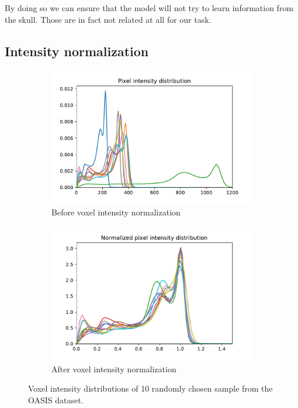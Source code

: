 By doing so we can ensure that the model will not try to learn information from the skull. Those are in fact not related at all for our task.

\subsection{Intensity normalization}

\begin{figure}
\centering
\begin{subfigure}{.5\textwidth}
  \centering
  \includegraphics[width=1\linewidth]{figures/preprocessing/intensity_before_norm.pdf}
  \caption{Before voxel intensity normalization}
  \label{fig:before_intensity_normalization}
\end{subfigure}%
\begin{subfigure}{.5\textwidth}
  \centering
  \includegraphics[width=1\linewidth]{figures/preprocessing/intensity_after_norm.pdf}
  \caption{After voxel intensity normalization}
  \label{fig:after_intensity_normalization}
\end{subfigure}
\caption{Voxel intensity distributions of 10 randomly chosen sample from the OASIS dataset.}
\label{fig:intensity_normalization}
\end{figure}

